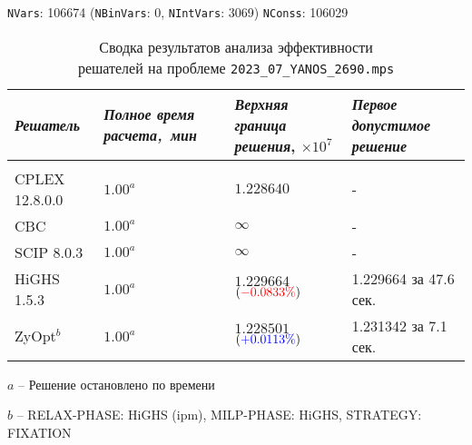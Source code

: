 \documentclass[%
	11pt,
	a4paper,
	utf8,
		]{article}
\begin{document}
{
	\begin{table}[!h]
		\centering
		\caption{Сводка результатов анализа эффективности \\решателей на проблеме \texttt{2023\_07\_YANOS\_2690.mps}}
		
		{\footnotesize \texttt{NVars}: 106674 (\texttt{NBinVars}: 0,  \texttt{NIntVars}: 3069) \texttt{NConss}: 106029}\\[2mm]
		
		\begin{tabular}{ p{2.7cm} p{2.5cm} p{3.6cm} p{3.7cm}}
			\emph{Решатель} & \emph{Полное время \mbox{расчета, мин}} & \emph{Верхняя граница} \mbox{\itshape решения}, $ \times 10^{7} $ & \emph{Первое допустимое решение} \\
			\hline\hline\\[-3.5mm]
			{CPLEX 12.8.0.0} & $ 1.00^a $ & $ 1.228640 $ & - \\
			\hline
			{CBC} & $ 1.00^a $ & $ \infty $ & - \\
			\hline
			{SCIP 8.0.3} & $ 1.00^a $ & $ \infty $ & -  \\
			\hline
			{HiGHS 1.5.3} & $ 1.00^a $ & $ 1.229664 $ $ ({\color{red} -0.0833\%}) $ & 1.229664 за 47.6 сек. \\
			\hline
			ZyOpt$^b$ & $ 1.00^a $  & $ 1.228501 $ $ ({\color{blue} +0.0113\%}) $ & 1.231342 за 7.1 сек. \\
		\end{tabular}
	\end{table}
	\vspace*{-3mm}
	\hspace*{5mm}$ a $ -- {\footnotesize Решение остановлено по времени}
	
	\hspace*{5mm}$ b $ -- {\footnotesize RELAX-PHASE: HiGHS (ipm), MILP-PHASE: HiGHS, STRATEGY: FIXATION}
}
\end{document}
